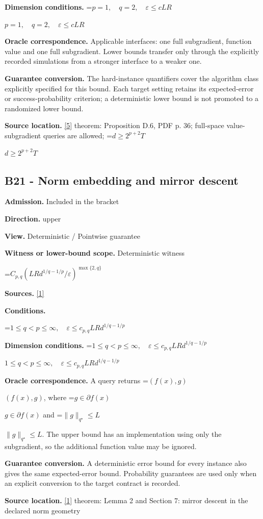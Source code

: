 \documentclass[10pt,a4paper]{article}
\newcommand{\AtlasMath}[1]{\par\begingroup\centering\setbox0=\hbox{$\displaystyle #1$}\ifdim\wd0>1.4\linewidth\typeout{ATLAS WIDE FORMULA: \the\wd0}\fi\ifdim\wd0>\linewidth\resizebox{\linewidth}{!}{\box0}\else\box0\fi\par\endgroup}
\newcommand{\AtlasInlineMath}[1]{\begingroup\setbox0=\hbox{$#1$}\ifdim\wd0>.4\linewidth\endgroup\AtlasMath{#1}\else\endgroup$#1$\fi}
\begin{document}
\textbf{Dimension conditions.} \AtlasInlineMath{p=1,\quad q=2,\quad\varepsilon\le cLR}

\textbf{Oracle correspondence.} Applicable interfaces: one full subgradient, function value and one full subgradient. Lower bounds transfer only through the explicitly recorded simulations from a stronger interface to a weaker one.

\textbf{Guarantee conversion.} The hard-instance quantifiers cover the algorithm class explicitly specified for this bound. Each target setting retains its expected-error or success-probability criterion; a deterministic lower bound is not promoted to a randomized lower bound.

\textbf{Source location.} \href{https://arxiv.org/pdf/2609.32910}{[5]} theorem: Proposition D.6, PDF p. 36; full-space value-subgradient queries are allowed; \AtlasInlineMath{d\ge2^{p+2}T}

\subsection{B21 - Norm embedding and mirror descent}
\textbf{Admission.} Included in the bracket

\textbf{Direction.} upper

\textbf{View.} Deterministic / Pointwise guarantee

\textbf{Witness or lower-bound scope.} Deterministic witness

\AtlasMath{C_{p,q}(LRd^{1/q-1/p}/\varepsilon)^{\max\{2,q\}}}
\textbf{Sources.} \href{https://arxiv.org/pdf/1107.4080}{[1]}

\textbf{Conditions.} 
\AtlasMath{1\le q<p\le\infty,\quad\varepsilon\le c_{p,q}LRd^{1/q-1/p}}


\textbf{Dimension conditions.} \AtlasInlineMath{1\le q<p\le\infty,\quad\varepsilon\le c_{p,q}LRd^{1/q-1/p}}

\textbf{Oracle correspondence.} A query returns \AtlasInlineMath{(f(x),g)}, where \AtlasInlineMath{g\in\partial f(x)} and \AtlasInlineMath{\|g\|_{q^\star}\le L}. The upper bound has an implementation using only the subgradient, so the additional function value may be ignored.

\textbf{Guarantee conversion.} A deterministic error bound for every instance also gives the same expected-error bound. Probability guarantees are used only when an explicit conversion to the target contract is recorded.

\textbf{Source location.} \href{https://arxiv.org/pdf/1107.4080}{[1]} theorem: Lemma 2 and Section 7: mirror descent in the declared norm geometry
\end{document}
